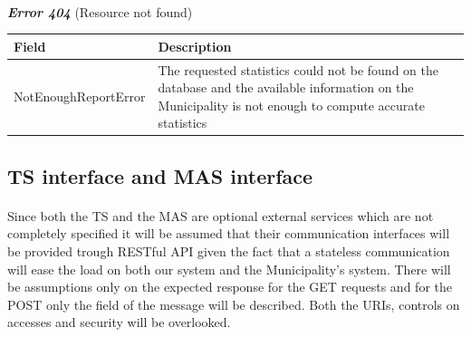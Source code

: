 						\paragraph{}
							\textcolor{myRed}{\textit{\textbf{Error 404}}} (Resource not found)
							\vspace{-2mm}
							\begin{table}[!h]
								\begin{tabular}{L{0.35\textwidth}L{0.57\textwidth}}
									\toprule
									\textbf{Field} & \textbf{Description} \\
									\midrule
								  	NotEnoughReportError & The requested statistics could not be found on the database and the available information on the Municipality is not enough to compute accurate statistics \\
								 	\bottomrule
								\end{tabular}
							\end{table}
			\clearpage
			\subsection{TS interface and MAS interface}
				\paragraph{}
					Since both the TS and the MAS are optional external services which are not completely specified it will be assumed that their communication interfaces will be provided trough RESTful API given the fact that a stateless communication will ease the load on both our system and the Municipality's system. There will be assumptions only on the expected response for the GET requests and for the POST only the field of the message will be described. Both the URIs, controls on accesses and security will be overlooked.

